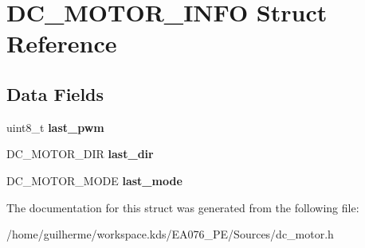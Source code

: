 \hypertarget{struct_d_c___m_o_t_o_r___i_n_f_o}{}\section{D\+C\+\_\+\+M\+O\+T\+O\+R\+\_\+\+I\+N\+FO Struct Reference}
\label{struct_d_c___m_o_t_o_r___i_n_f_o}
\subsection*{Data Fields}
\begin{DoxyCompactItemize}
\item 
\mbox{\label{struct_d_c___m_o_t_o_r___i_n_f_o_a290bc9a88403c8cf3dd95b49b54e42da}} 
uint8\+\_\+t {\bfseries last\+\_\+pwm}
\item 
\mbox{\label{struct_d_c___m_o_t_o_r___i_n_f_o_af87afb02a7d423cedb328129dfbc9ebf}} 
D\+C\+\_\+\+M\+O\+T\+O\+R\+\_\+\+D\+IR {\bfseries last\+\_\+dir}
\item 
\mbox{\label{struct_d_c___m_o_t_o_r___i_n_f_o_ada25c7e3e5dae1bb1ac31761ce2208b9}} 
D\+C\+\_\+\+M\+O\+T\+O\+R\+\_\+\+M\+O\+DE {\bfseries last\+\_\+mode}
\end{DoxyCompactItemize}


The documentation for this struct was generated from the following file\+:\begin{DoxyCompactItemize}
\item 
/home/guilherme/workspace.\+kds/\+E\+A076\+\_\+\+P\+E/\+Sources/dc\+\_\+motor.\+h\end{DoxyCompactItemize}
